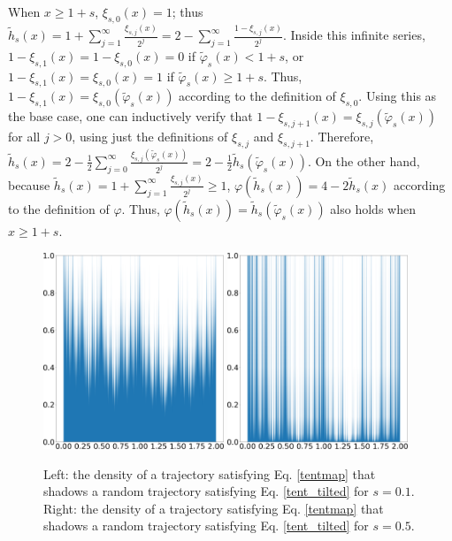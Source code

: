 \documentclass[preprint,12pt]{elsarticle}
\begin{document}
When $x\ge1+s$, $\xi_{s,0}(x)=1$; thus
$\tilde{h}_s(x) = 1+ \sum_{j=1}^{\infty} \frac{\xi_{s,j}(x)}{2^j}
                = 2- \sum_{j=1}^{\infty} \frac{1-\xi_{s,j}(x)}{2^j}$.
Inside this infinite series, $1-\xi_{s,1}(x)=1-\xi_{s,0}(x)=0$ if $\tilde\varphi_s(x)<1+s$,
or $1-\xi_{s,1}(x)=\xi_{s,0}(x)=1$ if $\tilde\varphi_s(x)\ge 1+s$.
Thus, $1-\xi_{s,1}(x) = \xi_{s,0}(\tilde{\varphi}_s(x))$ according to the definition of $\xi_{s,0}$.
Using this as the base case, one can inductively verify that
$1-\xi_{s,j+1}(x) = \xi_{s,j}(\tilde\varphi_s(x))$
for all $j>0$, using just the definitions of $\xi_{s,j}$ and $\xi_{s,j+1}$.
Therefore,
$\tilde{h}_s(x) = 2 - \frac12 \sum_{j=0}^{\infty} \frac{\xi_{s,j}(\tilde\varphi_s(x))}{2^j}
=2 - \frac12 \tilde{h}_s(\tilde\varphi_s(x))$.
On the other hand, because
$\tilde{h}_s(x) = 1+\sum_{j=1}^{\infty} \frac{\xi_{s,j}(x)}{2^j}\ge 1$,
$\varphi(\tilde{h}_s(x)) = 4 - 2 \tilde{h}_s(x)$ according
to the definition of $\varphi$.  Thus,
$\varphi(\tilde{h}_s(x)) = \tilde{h}_s(\tilde\varphi_s(x))$ also holds when $x\ge 1+s$.

\begin{figure}
   \includegraphics[width=0.48\textwidth]{tilted_conjugate_density_0.1.png}
    \hspace{0.02\textwidth}
    \includegraphics[width=0.48\textwidth]{tilted_conjugate_density_0.5.png}
   \caption{
     Left: the density of a trajectory satisfying Eq. \ref{tentmap}
    that shadows a random trajectory satisfying Eq. \ref{tent_tilted} for $s=0.1$.
    Right: the density of a trajectory satisfying Eq. \ref{tentmap}
    that shadows a random trajectory satisfying Eq. \ref{tent_tilted} for $s=0.5$.
    }
    \label{fig:tilted_tent_density}
\end{figure}
\end{document}
